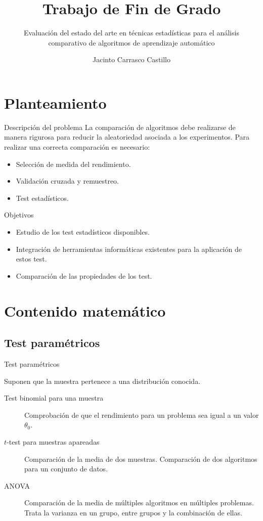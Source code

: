 \documentclass[leqno]{beamer}
\title{Trabajo de Fin de Grado}
\subtitle{Evaluación del estado del arte en técnicas estadísticas para el análisis comparativo de algoritmos de aprendizaje automático}
\author{Jacinto Carrasco Castillo}
\theoremstyle{definition_wo_parentheses}
\begin{document}
\begin{frame}
\titlepage
\end{frame}

\begin{frame}
\tableofcontents
\end{frame}

\section{Planteamiento}


\begin{frame}{Descripción del problema}
	La comparación de algoritmos debe realizarse de manera 
rigurosa para reducir la aleatoriedad asociada a los 
experimentos. Para realizar una correcta comparación es 
necesario:
	
\begin{itemize}
	\item Selección de medida del rendimiento.
	\item Validación cruzada y remuestreo. 
	\item Test estadísticos.
\end{itemize}
\end{frame}

\begin{frame}{Objetivos}
\begin{itemize}
	\item Estudio de los test estadísticos disponibles.
	\item Integración de herramientas informáticas existentes
	 para la aplicación de estos test.
	\item Comparación de las propiedades de los test.
\end{itemize}
\end{frame}

\section{Contenido matemático}

\subsection{Test paramétricos}
\begin{frame}{Test paramétricos}

	Suponen que la muestra pertenece a una distribución conocida. 

\begin{description}
\item[Test binomial para una muestra] Comprobación de que 
	el rendimiento para un problema sea igual a un valor 
	$\theta_0$.
\item[$t$-test para muestras apareadas]  Comparación de la 
	media de dos muestras. Comparación de dos algoritmos
	para un conjunto de datos.
\item[ANOVA] Comparación de la media de múltiples algoritmos
	en múltiples problemas. Trata la varianza
	en un grupo, entre grupos y la combinación de ellas.
\end{description}
\end{frame}
\end{document}
